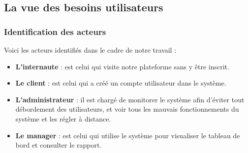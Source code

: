 \subsection[La vue des besoins utilisateurs]{La vue des besoins utilisateurs}    
    \subsubsection[Identification des acteurs]{Identification des acteurs}
    Voici les acteurs identifiés dans le cadre de notre
    travail :
    \par
        \begin{itemize}
            \setlength{\itemsep}{0pt}
            \item [\ding{226}] \textbf{L’internaute} : est celui qui visite
            notre plateforme sans y être inscrit.
            \item [\ding{226}] \textbf{Le client} : est celui qui a créé un compte
            utilisateur dans le système.
            \item [\ding{226}] \textbf{L’administrateur} : il est chargé de
            monitorer le système afin d’éviter tout débordement des utilisateurs,
            et voir tous les mauvais fonctionnements du système et les régler
            à distance.
            \item [\ding{226}] \textbf{Le manager} : est celui qui utilise le système
            pour visualiser le tableau de bord et consulter le rapport.
        \end{itemize}
